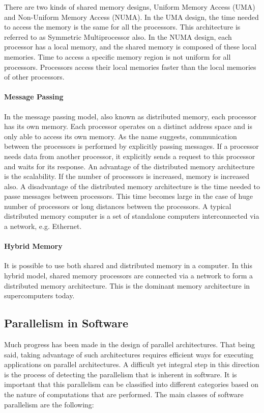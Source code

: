 There are two kinds of shared memory designs, Uniform Memory Access (UMA) and Non-Uniform Memory Access (NUMA). In the UMA design, the time needed to access the memory is the same for all the processors. This architecture is referred to as Symmetric Multiprocessor also. In the NUMA design, each processor has a local memory, and the shared memory is composed of these local memories. Time to access a specific memory region is not uniform for all processors. Processors access their local memories faster than the local memories of other processors.

\paragraph{Message Passing}

In the message passing model, also known as distributed memory, each processor has its own memory. Each processor operates on a distinct address space and is only able to access its own memory. As the name suggests, communication between the processors is performed by explicitly passing messages. If a processor needs data from another processor, it explicitly sends a request to this processor and waits for its response. An advantage of the distributed memory architecture is the scalability. If the number of processors is increased, memory is increased also. A disadvantage of the distributed memory architecture is the time needed to passe messages between processors. This time becomes large in the case of huge number of processors or long distances between the processors. A typical distributed memory computer is a set of standalone computers interconnected via a network, e.g. Ethernet.

\paragraph{Hybrid Memory}

It is possible to use both shared and distributed memory in a computer. In this hybrid model, shared memory processors are connected via a network to form a distributed memory architecture. This is the dominant memory architecture in supercomputers today.

\subsection{Parallelism in Software}

Much progress has been made in the design of parallel architectures. That being said, taking advantage of such architectures requires efficient ways for executing applications on parallel architectures. A difficult yet integral step in this direction is the process of detecting the parallelism that is inherent in software. It is important that this parallelism can be classified into different categories based on the nature of computations that are performed. The main classes of software parallelism are the following:    

